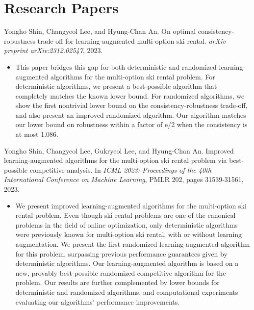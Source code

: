 \documentclass{cv}
\begin{document}
\section{Research Papers}
Yongho Shin, Changyeol Lee, and Hyung-Chan An. On optimal consistency-robustness trade-off for learning-augmented multi-option ski rental. \emph{arXiv preprint arXiv:2312.02547}, 2023.
\vspace{\killinitspace}
\begin{itemize}
\item This paper bridges this gap for both deterministic and randomized learning-augmented algorithms for the multi-option ski rental problem. For deterministic algorithms, we present a best-possible algorithm that completely matches the known lower bound. For randomized algorithms, we show the first nontrivial lower bound on the consistency-robustness trade-off, and also present an improved randomized algorithm. Our algorithm matches our lower bound on robustness within a factor of e/2 when the consistency is at most 1.086.
\end{itemize}

Yongho Shin, Changyeol Lee, Gukryeol Lee, and Hyung-Chan An. Improved learning-augmented algorithms for the multi-option ski rental problem via best-possible competitive analysis. In \emph{ICML 2023: Proceedings of the 40th International Conference on Machine Learning}, PMLR 202, pages 31539-31561, 2023.
\vspace{\killinitspace}
\begin{itemize}
\item We present improved learning-augmented algorithms for the multi-option ski rental problem. Even though ski rental problems are one of the canonical problems in the field of online optimization, only deterministic algorithms were previously known for multi-option ski rental, with or without learning augmentation. We present the first randomized learning-augmented algorithm for this problem, surpassing previous performance guarantees given by deterministic algorithms. Our learning-augmented algorithm is based on a new, provably best-possible randomized competitive algorithm for the problem. Our results are further complemented by lower bounds for deterministic and randomized algorithms, and computational experiments evaluating our algorithms’ performance improvements.
\end{itemize}
\end{document}
